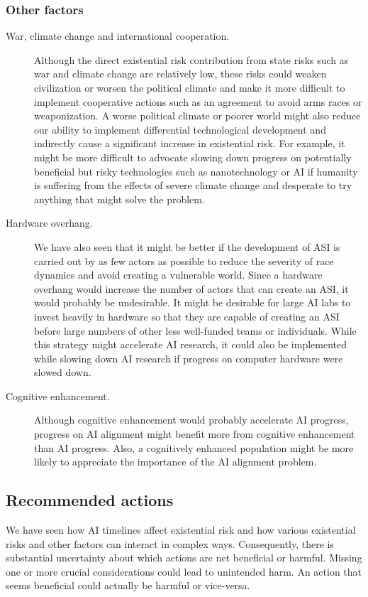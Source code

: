 \documentclass{article}
\begin{document}
\subsubsection{Other factors}

\begin{description}
    \item[War, climate change and international cooperation.] Although the direct existential risk contribution from state risks such as war and climate change are relatively low, these risks could weaken civilization or worsen the political climate and make it more difficult to implement cooperative actions such as an agreement to avoid arms races or weaponization. A worse political climate or poorer world might also reduce our ability to implement differential technological development and indirectly cause a significant increase in existential risk. For example, it might be more difficult to advocate slowing down progress on potentially beneficial but risky technologies such as nanotechnology or AI if humanity is suffering from the effects of severe climate change and desperate to try anything that might solve the problem.
    \item[Hardware overhang.] We have also seen that it might be better if the development of ASI is carried out by as few actors as possible to reduce the severity of race dynamics and avoid creating a vulnerable world. Since a hardware overhang would increase the number of actors that can create an ASI, it would probably be undesirable. It might be desirable for large AI labs to invest heavily in hardware so that they are capable of creating an ASI before large numbers of other less well-funded teams or individuals.  While this strategy might accelerate AI research, it could also be implemented while slowing down AI research if progress on computer hardware were slowed down.
    \item[Cognitive enhancement.] Although cognitive enhancement would probably accelerate AI progress, progress on AI alignment might benefit more from cognitive enhancement than AI progress. Also, a cognitively enhanced population might be more likely to appreciate the importance of the AI alignment problem.
\end{description}

\subsection{Recommended actions}

We have seen how AI timelines affect existential risk and how various existential risks and other factors can interact in complex ways. Consequently, there is substantial uncertainty about which actions are net beneficial or harmful. Missing one or more crucial considerations could lead to unintended harm. An action that seems beneficial could actually be harmful or vice-versa.
\end{document}
